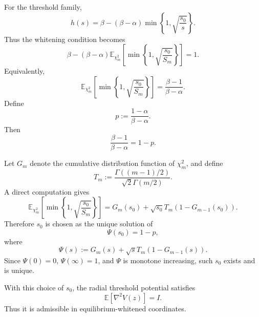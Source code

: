 \documentclass[11pt]{article}
\numberwithin{equation}{section}
\begin{document}
For the threshold family,
\begin{equation}
    h(s)
    =
    \beta
    -
    (\beta-\alpha)
    \min
    \left\{
    1,\sqrt{\frac{s_0}{s}}
    \right\}.
\end{equation}
Thus the whitening condition becomes
\begin{equation}
    \beta
    -
    (\beta-\alpha)
    \mathbb E_{\chi_m^2}
    \left[
    \min
    \left\{
    1,\sqrt{\frac{s_0}{S_m}}
    \right\}
    \right]
    =
    1.
\end{equation}
Equivalently,
\begin{equation}
    \mathbb E_{\chi_m^2}
    \left[
    \min
    \left\{
    1,\sqrt{\frac{s_0}{S_m}}
    \right\}
    \right]
    =
    \frac{\beta-1}{\beta-\alpha}.
\end{equation}
Define
\begin{equation}
    p:=\frac{1-\alpha}{\beta-\alpha}.
\end{equation}
Then
\begin{equation}
    \frac{\beta-1}{\beta-\alpha}
    =
    1-p.
\end{equation}

Let $G_m$ denote the cumulative distribution function of $\chi_m^2$, and define
\begin{equation}
    T_m
    :=
    \frac{\Gamma((m-1)/2)}
    {\sqrt{2}\Gamma(m/2)}.
\end{equation}
A direct computation gives
\begin{equation}
    \mathbb E_{\chi_m^2}
    \left[
    \min
    \left\{
    1,\sqrt{\frac{s_0}{S_m}}
    \right\}
    \right]
    =
    G_m(s_0)
    +
    \sqrt{s_0}T_m
    \left(1-G_{m-1}(s_0)\right).
\end{equation}
Therefore $s_0$ is chosen as the unique solution of
\begin{equation}
    \Psi(s_0)
    =
    1-p,
\end{equation}
where
\begin{equation}
    \Psi(s)
    :=
    G_m(s)
    +
    \sqrt{s}T_m
    \left(1-G_{m-1}(s)\right).
\end{equation}
Since $\Psi(0)=0$, $\Psi(\infty)=1$, and $\Psi$ is monotone increasing, such $s_0$ exists and is unique.

With this choice of $s_0$, the radial threshold potential satisfies
\begin{equation}
    \mathbb E[\nabla^2 V(z)] = I.
\end{equation}
Thus it is admissible in equilibrium-whitened coordinates.
\end{document}
